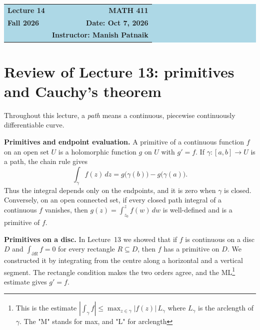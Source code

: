 \documentclass[11pt]{article}
\theoremstyle{plain}
\theoremstyle{definition}
\theoremstyle{remark}
\numberwithin{equation}{section}
\begin{document}
\begin{center}
  \colorbox{lightblue}{%
    \begin{minipage}{0.94\textwidth}
      \vspace{0.55em}
      \begin{tabular*}{\textwidth}{@{\extracolsep{\fill}}lr}
        {\color{courseblue}\bfseries\LARGE Lecture 14} &
        {\color{courseblue}\bfseries\LARGE MATH 411}\\[0.35em]
        \textbf{Fall 2026} & \textbf{Date: Oct 7, 2026}\\
        & \textbf{Instructor: Manish Patnaik}
      \end{tabular*}
      \vspace{0.45em}
    \end{minipage}}
\end{center}

\setcounter{tocdepth}{1}
\tableofcontents
\vspace{0.45em}

\section{Review of Lecture 13: primitives and Cauchy's theorem}
Throughout this lecture, a \emph{path} means a continuous, piecewise
continuously differentiable curve.

\textbf{Primitives and endpoint evaluation.} A primitive of a continuous
function $f$ on an open set $U$ is a holomorphic function $g$ on $U$ with
$g'=f$. If $\gamma\colon[a,b]\to U$ is a path, the chain rule gives
\begin{equation}\label{eq:review-primitive}
 \int_\gamma f(z)\,dz=g\bigl(\gamma(b)\bigr)-g\bigl(\gamma(a)\bigr).
\end{equation}
Thus the integral depends only on the endpoints, and it is zero when
$\gamma$ is closed. Conversely, on an open connected set, if every closed
path integral of a continuous $f$ vanishes, then
$g(z)=\int_{z_0}^z f(w)\,dw$ is well-defined and is a primitive of $f$.

\textbf{Primitives on a disc.} In Lecture~13 we showed that if $f$ is
continuous on a disc $D$ and $\int_{\partial R}f=0$ for every 
rectangle $R\subseteq D$, then $f$ has a primitive on $D$. We constructed
it by integrating from the centre along a horizontal and a vertical
segment. The rectangle condition makes the two orders agree, and the
ML\footnote{This is the estimate $|\int_{\gamma} f| \leq \max_{z \in \gamma} |f(z)| \, L_{\gamma}$ where $L_{\gamma}$ is the arclength of $\gamma$. The "M" stands for max, and "L" for arclength } estimate gives $g'=f$.
\end{document}
